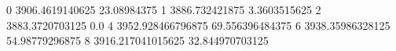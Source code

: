 0 3906.4619140625 23.08984375
1 3886.732421875 3.3603515625
2 3883.3720703125 0.0
4 3952.928466796875 69.556396484375
6 3938.35986328125 54.98779296875
8 3916.217041015625 32.844970703125
